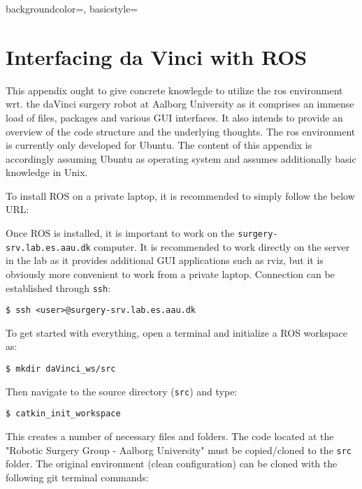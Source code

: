 {
    backgroundcolor=\color{black},
    basicstyle=\scriptsize\color{green}%
}
\chapter{Interfacing da Vinci with ROS}\label{app:ros}
This appendix ought to give concrete knowlegde to utilize the \gls{ros} environment wrt. the \gls{daVinci} surgery robot at Aalborg University as it comprises an immense load of files, packages and various GUI interfaces. It also intends to provide an overview of the code structure and the underlying thoughts. The \gls{ros} environment is currently only developed for Ubuntu. The content of this appendix is accordingly assuming Ubuntu as operating system and assumes additionally basic knowledge in Unix. 

To install ROS on a private laptop, it is recommended to simply follow the below URL:

\hspace{1cm} {}

Once ROS is installed, it is important to work on the \texttt{surgery-srv.lab.es.aau.dk} computer. It is recommended to work directly on the server in the lab as it provides additional GUI applications such as rviz, but it is obviously more convenient to work from a private laptop. Connection can be established through \texttt{ssh}:

\hspace{1cm} \texttt{\$ ssh <user>@surgery-srv.lab.es.aau.dk}

To get started with everything, open a terminal and initialize a ROS workspace as:

\hspace{1cm} \texttt{\$ mkdir daVinci\_ws/src}

Then navigate to the source directory (\texttt{src}) and type:

\hspace{1cm} \texttt{\$ catkin\_init\_workspace}

This creates a number of necessary files and folders. The code located at the "Robotic Surgery Group - Aalborg University" must be copied/cloned to the \texttt{src} folder. %
The original environment (clean configuration) can be cloned with the following git terminal commands:\vspace{0.1cm}


